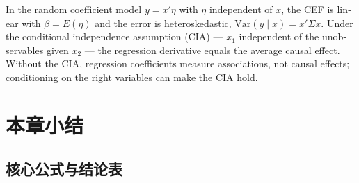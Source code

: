 \begin{english}
In the random coefficient model $y=x'\eta$ with $\eta$ independent of $x$, the CEF is linear with $\beta=E(\eta)$ and the error is heteroskedastic, $\mathrm{Var}(y\mid x)=x'\Sigma x$. Under the conditional independence assumption (CIA) --- $x_1$ independent of the unobservables given $x_2$ --- the regression derivative equals the average causal effect. Without the CIA, regression coefficients measure associations, not causal effects; conditioning on the right variables can make the CIA hold.
\end{english}

\section{本章小结}\label{sec:U02-summary}

\subsection{核心公式与结论表}

